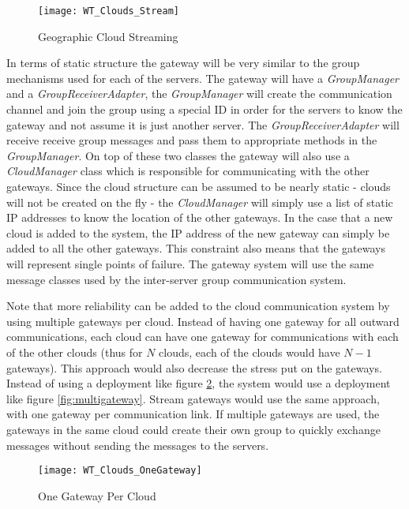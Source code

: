 \begin{figure}
	\centering
	\texttt{[image: WT\_Clouds\_Stream]}
	\caption{Geographic Cloud Streaming}
	\label{fig:cloudstream}
\end{figure}

In terms of static structure the gateway will be very similar to the group mechanisms used for each of the servers. The gateway will have a \textit{GroupManager} and a \textit{GroupReceiverAdapter}, the \textit{GroupManager} will create the communication channel and join the group using a special ID in order for the servers to know the gateway and not assume it is just another server. The \textit{GroupReceiverAdapter} will receive receive group messages and pass them to appropriate methods in the \textit{GroupManager}. On top of these two classes the gateway will also use a \textit{CloudManager} class which is responsible for communicating with the other gateways. Since the cloud structure can be assumed to be nearly static - clouds will not be created on the fly - the \textit{CloudManager} will simply use a list of static IP addresses to know the location of the other gateways. In the case that a new cloud is added to the system, the IP address of the new gateway can simply be added to all the other gateways. This constraint also means that the gateways will represent single points of failure. The gateway system will use the same message classes used by the inter-server group communication system.

Note that more reliability can be added to the cloud communication system by using multiple gateways per cloud. Instead of having one gateway for all outward communications, each cloud can have one gateway for communications with each of the other clouds (thus for $N$ clouds, each of the clouds would have $N-1$ gateways). This approach would also decrease the stress put on the gateways. Instead of using a deployment like figure \ref{fig:singlegateway}, the system would use a deployment like figure \ref{fig:multigateway}. Stream gateways would use the same approach, with one gateway per communication link. If multiple gateways are used, the gateways in the same cloud could create their own group to quickly exchange messages without sending the messages to the servers.

\begin{figure}
	\centering
	\texttt{[image: WT\_Clouds\_OneGateway]}
	\caption{One Gateway Per Cloud}
	\label{fig:singlegateway}
\end{figure}

